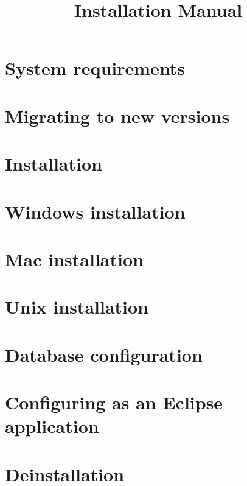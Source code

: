 
%
\title{Installation Manual}
\author*{}{}
\maketitle


\tableofcontents
\renewcommand{\bxcomment}[2]{}%
\clearpage
\setcounter{secnumdepth}{2}%

\chapter{System requirements}

\clearpage
\chapter{Migrating to new versions}

\clearpage
\chapter{Installation}

\clearpage
\chapter{Windows installation}

\clearpage
\chapter{Mac installation}

\clearpage
\chapter{Unix installation}
\label{Unix}

\clearpage
\chapter{Database configuration}


\chapter{Configuring as an Eclipse application}

\clearpage
\chapter{Deinstallation}

